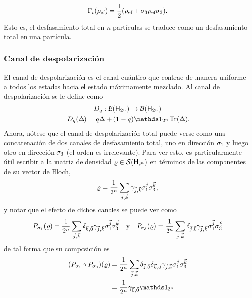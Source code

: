 \begin{equation}
    \Gamma_{t}(\rho_{\text{ef}})=\frac{1}{2}(\rho_{\text{ef}}+\sigma_{3}\rho_{\text{ef}}\sigma_{3}).\nonumber
\end{equation}
Esto es, el desfasamiento total en $n$ partículas se traduce como un desfasamiento total en una partícula.


\subsubsection{Canal de despolarización}

El canal de despolarización es el canal cuántico que contrae de manera uniforme a todos los estados hacia el estado máximamente mezclado. Al canal de despolarización se le define como
\begin{gather}\label{eq:DepolarizingChannelN}
    D_{q}:\mcB(\hilbert_{2^{n}}) \rightarrow \mcB(\hilbert_{2^{n}})\nonumber\\
    D_{q}(\Delta)=q\Delta+(1-q)\Id_{2^{n}}\Tr(\Delta)\rlap{.}
\end{gather}
Ahora, nótese que el canal de despolarización total puede verse como una concatenación de dos canales de desfasamiento total, uno en dirección $\sigma_{1}$ y luego otro en dirección $\sigma_{3}$ (el orden es irrelevante). Para ver esto, es particularmente útil escribir a la matriz de densidad $\varrho\in\mathcal{S}({\sf H}_{2^{n}})$ en términos de las componentes de su vector de Bloch,
\begin{equation}
    \varrho=\frac{1}{2^{n}}\sum_{\vec{j},\vec{k}}\gamma_{\vec{j},\vec{k}}\sigma_{1}^{\vec{j}}\sigma_{3}^{\vec{k}},\nonumber
\end{equation}
y notar que el efecto de dichos canales se puede ver como
\begin{align}
  P_{\sigma_{1}}(\varrho)=\frac{1}{2^{n}}\sum_{\vec{j},\vec{k}}\delta_{\vec{k},\vec{0}}\gamma_{\vec{j},\vec{k}}\sigma_{1}^{\vec{j}}\sigma_{3}^{\vec{k}}  & & \text{y} & & P_{\sigma_{3}}(\varrho)=\frac{1}{2^{n}}\sum_{\vec{j},\vec{k}}\delta_{\vec{j},\vec{0}}\gamma_{\vec{j},\vec{k}}\sigma_{1}^{\vec{j}}\sigma_{3}^{\vec{k}} \nonumber
\end{align}
de tal forma que su composición es
\begin{align}
    \qty(P_{\pauli{1}}\circ P_{\pauli{3}})(\varrho)&=\frac{1}{2^{n}}\sum_{\vec{j},\vec{k}}\delta_{\vec{j},\vec{0}}\delta_{\vec{k},\vec{0}}\gamma_{\vec{j},\vec{k}}\pauli{1}^{\vec{j}}\pauli{3}^{\vec{k}}\nonumber\\
    &=\frac{1}{2^{n}}\gamma_{\vec{0},\vec{0}}\Id_{2^{n}}.\nonumber
\end{align}
